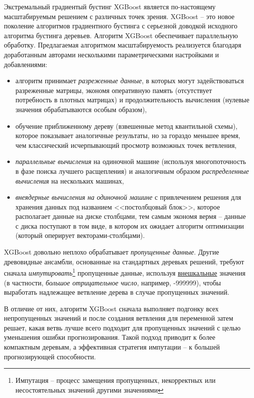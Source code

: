 \documentclass[%
	11pt,
	a4paper,
	utf8,
		]{article}
\begin{document}
Экстремальный градиентый бустинг XGBoost является по-настоящему масштабируемым решением с различных точек зрения. XGBoost -- это новое поколение алгоритмов градиентного бустинга с серьезной доводкой исходного алгоритма бустинга деревьев. Алгоритм XGBoost обеспечивает параллельную обработку. Предлагаемая алгоритмом масштабируемость реализуется благодаря доработанным авторами несколькими параметрическими настройками и добавлениями:
\begin{itemize}
	\item алгоритм принимает \emph{разреженные данные}, в которых могут задействоваться разреженные матрицы, экономя оперативную память (отсутствует потребность в плотных матрицах) и продолжительность вычисления (нулевые значения обрабатываются особым образом),
	
	\item обучение приближенному дереву (взвешенные метод квантильной схемы), которое показывает аналогичные результаты, но за гораздо меньшее время, чем классический исчерпывающий просмотр возможных точек ветвления,
	
	\item \emph{параллельные вычисления} на одиночной машине (используя многопоточность в фазе поиска лучшего расщепления) и аналогичным образом \emph{распределенные вычисления} на нескольких машинах,
	
	\item \emph{внеядерные вычисления на одиночной машине} с привлечением решения для хранения данных под названием <<постолбцовый блок>>, которое располагает данные на диске столбцами, тем самым экономя вермя -- данные с диска поступают в том виде, в котором их ожидает алгоритм оптимизации (который оперирует векторами-столбцами).
\end{itemize} 

XGBoost довольно неплохо обрабатывает \emph{пропущенные данные}. Другие древовидные ансамбли, основанные на стандартных деревьях решений, требуют сначала \emph{импутировать}\footnote{Импутация -- процесс замещения пропущенных, некорректных или несостоятельных значений другими значениями} пропущенные данные, используя \underline{внешкальные} значения (в частности, \emph{большое отрицательное число}, например, -999999), чтобы выработать надлежащее ветвление дерева в случае пропущенных значений.

В отличие от них, алгоритм XGBoost сначала выполняет подгонку всех непропущенных значений и после создания ветвления для переменной затем решает, какая ветвь лучше всего подходит для пропущенных значений с целью уменьшения ошибки прогнозирования. Такой подход приводит к более компактным деревьям, а эффективная стратегия импутации -- к большей прогнозирующей способности.
\end{document}

